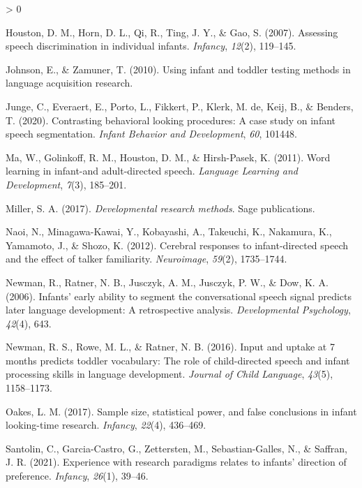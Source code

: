 \documentclass[
  english,
  man,floatsintext]{apa6}
\newlength{\cslhangindent}
\newenvironment{CSLReferences}[2] %
 {%
  \setlength{\parindent}{0pt}
  \ifodd #1 \everypar{\setlength{\hangindent}{\cslhangindent}}\ignorespaces\fi
  \ifnum #2 > 0
  \setlength{\parskip}{#2\baselineskip}
  \fi
 }%
 {}
\begin{document}
\begin{CSLReferences}{1}{0}
\leavevmode\hypertarget{ref-houston2007assessing}{}%
Houston, D. M., Horn, D. L., Qi, R., Ting, J. Y., \& Gao, S. (2007). Assessing speech discrimination in individual infants. \emph{Infancy}, \emph{12}(2), 119--145.

\leavevmode\hypertarget{ref-johnson2010using}{}%
Johnson, E., \& Zamuner, T. (2010). Using infant and toddler testing methods in language acquisition research.

\leavevmode\hypertarget{ref-junge2020contrasting}{}%
Junge, C., Everaert, E., Porto, L., Fikkert, P., Klerk, M. de, Keij, B., \& Benders, T. (2020). Contrasting behavioral looking procedures: A case study on infant speech segmentation. \emph{Infant Behavior and Development}, \emph{60}, 101448.

\leavevmode\hypertarget{ref-ma2011word}{}%
Ma, W., Golinkoff, R. M., Houston, D. M., \& Hirsh-Pasek, K. (2011). Word learning in infant-and adult-directed speech. \emph{Language Learning and Development}, \emph{7}(3), 185--201.

\leavevmode\hypertarget{ref-miller2017developmental}{}%
Miller, S. A. (2017). \emph{Developmental research methods}. Sage publications.

\leavevmode\hypertarget{ref-naoi2012cerebral}{}%
Naoi, N., Minagawa-Kawai, Y., Kobayashi, A., Takeuchi, K., Nakamura, K., Yamamoto, J., \& Shozo, K. (2012). Cerebral responses to infant-directed speech and the effect of talker familiarity. \emph{Neuroimage}, \emph{59}(2), 1735--1744.

\leavevmode\hypertarget{ref-newman2006infants}{}%
Newman, R., Ratner, N. B., Jusczyk, A. M., Jusczyk, P. W., \& Dow, K. A. (2006). Infants' early ability to segment the conversational speech signal predicts later language development: A retrospective analysis. \emph{Developmental Psychology}, \emph{42}(4), 643.

\leavevmode\hypertarget{ref-newman2016input}{}%
Newman, R. S., Rowe, M. L., \& Ratner, N. B. (2016). Input and uptake at 7 months predicts toddler vocabulary: The role of child-directed speech and infant processing skills in language development. \emph{Journal of Child Language}, \emph{43}(5), 1158--1173.

\leavevmode\hypertarget{ref-oakes2017sample}{}%
Oakes, L. M. (2017). Sample size, statistical power, and false conclusions in infant looking-time research. \emph{Infancy}, \emph{22}(4), 436--469.

\leavevmode\hypertarget{ref-santolin2021experience}{}%
Santolin, C., Garcia-Castro, G., Zettersten, M., Sebastian-Galles, N., \& Saffran, J. R. (2021). Experience with research paradigms relates to infants' direction of preference. \emph{Infancy}, \emph{26}(1), 39--46.


\end{CSLReferences}
\end{document}

